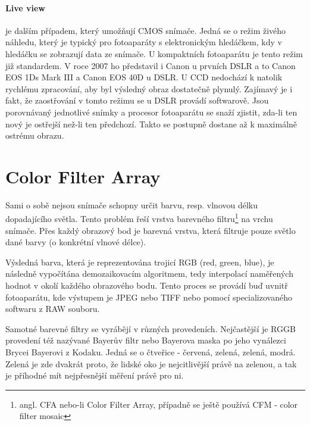 \documentclass[12pt,a4paper,titlepage,final]{report}
\begin{document}
\paragraph{Live view} je dalším případem, který umožňují CMOS snímače. Jedná se o režim živého náhledu, který je typický pro fotoaparáty s elektronickým hledáčkem, kdy v hledáčku se zobrazují data ze snímače. U kompaktních fotoaparátu je tento režim již standardem. V roce 2007 ho představil i Canon u prvních DSLR a to Canon EOS 1Ds Mark III a Canon EOS 40D u DSLR. U CCD nedochází k natolik rychlému zpracování, aby byl výsledný obraz dostatečně plynulý. Zajímavý je i fakt, že zaostřování v tomto režimu se u DSLR provádí softwarově. Jsou porovnávaný jednotlivé snímky a procesor fotoaparátu se snaží zjistit, zda-li ten nový je ostřejší než-li ten předchozí. Takto se postupně dostane až k maximálně ostrému obrazu.


\section{Color Filter Array}\label{sec:cfa}

Sami o sobě nejsou snímače schopny určit barvu, resp. vlnovou délku dopadajícího světla. Tento problém řeší vrstva barevného filtru\footnote{angl. CFA nebo-li Color Filter Array, případně se ještě používá CFM - color filter mosaic} na vrchu snímače. Přes každý obrazový bod je barevná vrstva, která filtruje pouze světlo dané barvy (o konkrétní vlnové délce).

Výsledná barva, která je reprezentována trojicí RGB (red, green, blue), je následně vypočítána demozaikovacím algoritmem, tedy interpolací naměřených hodnot v okolí každého obrazového bodu. Tento proces se provádí buď uvnitř fotoaparátu, kde výstupem je JPEG nebo TIFF nebo pomocí specializovaného softwaru z RAW souboru.

Samotné barevné filtry se vyrábějí v různých provedeních. Nejčastější je RGGB provedení též nazývané Bayerův filtr nebo Bayerova maska po jeho vynálezci Brycei Bayerovi z Kodaku. Jedná se o čtveřice - červená, zelená, zelená, modrá. Zelená je zde dvakrát proto, že lidské oko je nejcitlivější právě na zelenou, a tak je příhodné mít nejpřesnější měření právě pro ni.
\end{document}
